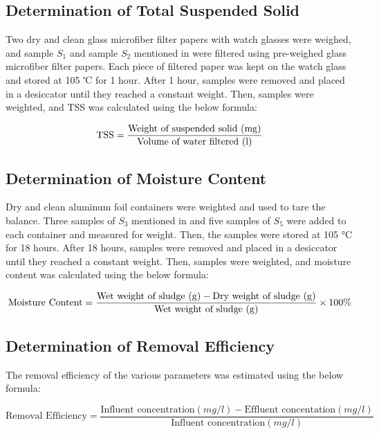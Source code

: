 \subsection{Determination of Total Suspended Solid}
Two dry and clean glass microfiber filter papers with watch glasses were weighed, and sample $S_1$ and sample $S_2$ mentioned in  were filtered using pre-weighed glass microfiber filter papers. Each piece of filtered paper was kept on the watch glass and stored at 105 ℃ for 1 hour. After 1 hour, samples were removed and placed in a desiccator until they reached a constant weight. Then, samples were weighted, and \ac{TSS} was calculated using the below formula:

\begin{equation}
    \text{TSS} = \dfrac{\text{Weight of suspended solid (\unit{mg})}}{\text{Volume of water filtered (\unit{l})}}
\end{equation}

\subsection{Determination of Moisture Content}
Dry and clean aluminum foil containers were weighted and used to tare the balance. Three samples of $S_3$ mentioned in  and five samples of $S_5$  were added to each container and measured for weight. Then, the samples were stored at 105 °C for 18 hours. After 18 hours, samples were removed and placed in a desiccator until they reached a constant weight. Then, samples were weighted, and moisture content was calculated using the below formula:

\begin{equation}
    \text{Moisture Content} = \dfrac{\text{Wet weight of sludge (\unit{g})} - \text{Dry weight of sludge (\unit{g})}}{\text{Wet weight of sludge (\unit{g})}} \times 100\%
\end{equation}

\subsection{Determination of Removal Efficiency}
The removal efficiency of the various parameters was estimated using the below formula:

\begin{equation}
    \text{Removal Efficiency} = \dfrac{\text{Influent concentration} \left( \unit{mg/l} \right) - \text{Effluent concentation} \left( \unit{mg/l} \right) }{\text{Influent concentration} \left( \unit{mg/l} \right)}
\end{equation}

